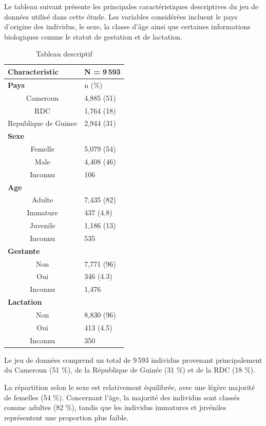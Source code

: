 \documentclass[a4paper]{article}
\begin{document}
Le tableau suivant présente les principales caractéristiques descriptives du jeu de données utilisé dans cette étude. Les variables considérées incluent le pays d’origine des individus, le sexe, la classe d’âge ainsi que certaines informations biologiques comme le statut de gestation et de lactation. 

\begin{table}[H]
\caption{Tableau descriptif}
\centering
\begin{tabular}{|c|l|}
\hline
\multicolumn{1}{|l|}{\textbf{Characteristic}} & \textbf{N = 9\,593} \\ \hline
\multicolumn{1}{|l|}{\textbf{Pays}} & n (\%) \\ \hline
Cameroun & 4,885 (51) \\
RDC & 1,764 (18) \\
Republique de Guinee & 2,944 (31) \\ \hline
\multicolumn{1}{|l|}{\textbf{Sexe}} & \\ \hline
Femelle & 5,079 (54) \\
Male & 4,408 (46) \\
Inconnu & 106 \\ \hline
\multicolumn{1}{|l|}{\textbf{Age}} & \\ \hline
Adulte & 7,435 (82) \\
Immature & 437 (4.8) \\
Juvenile & 1,186 (13) \\
Inconnu  & 535 \\ \hline
\multicolumn{1}{|l|}{\textbf{Gestante}} & \\ \hline
Non & 7,771 (96) \\
Oui & 346 (4.3) \\
Inconnu & 1,476 \\ \hline
\multicolumn{1}{|l|}{\textbf{Lactation}} & \\ \hline
Non & 8,830 (96) \\
Oui & 413 (4.5) \\
Inconnu & 350 \\ \hline
\end{tabular}
\end{table}

Le jeu de données comprend un total de 9\,593 individus provenant principalement du Cameroun (51 \%), de la République de Guinée (31 \%) et de la RDC (18 \%).

La répartition selon le sexe est relativement équilibrée, avec une légère majorité de femelles (54 \%). Concernant l’âge, la majorité des individus sont classés comme adultes (82 \%), tandis que les individus immatures et juvéniles représentent une proportion plus faible.
\end{document}
